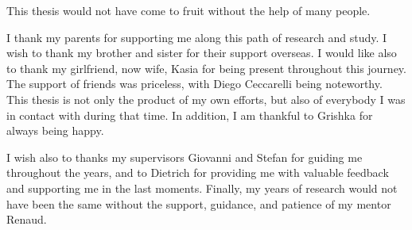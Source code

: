 This thesis would not have come to fruit without the help of many people.

I thank my parents for supporting me along this path of research and study. I wish to thank my brother and sister for their support overseas. I would like also to thank my girlfriend, now wife, Kasia for being present throughout this journey. The support of friends was priceless, with Diego Ceccarelli being noteworthy. This thesis is not only the product of my own efforts, but also of everybody I was in contact with during that time. In addition, I am thankful to Grishka for always being happy.

I wish also to thanks my supervisors Giovanni and Stefan for guiding me throughout the years, and to Dietrich for providing me with valuable feedback and supporting me in the last moments. Finally, my years of research would not have been the same without the support, guidance, and patience of my mentor Renaud.
